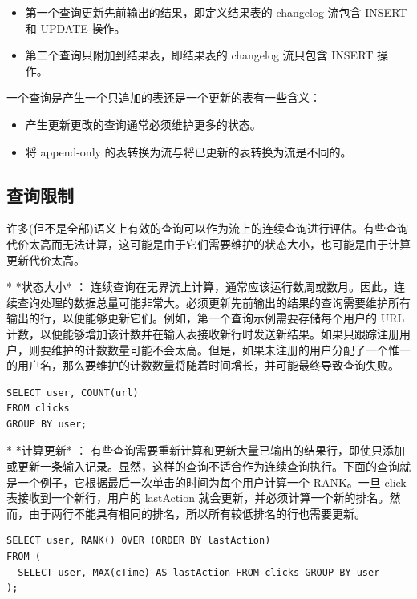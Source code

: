 \documentclass[cn,11pt,chinese]{elegantbook}
\begin{document}
\begin{itemize}
  \item 第一个查询更新先前输出的结果，即定义结果表的 changelog 流包含 INSERT 和 UPDATE 操作。
  \item 第二个查询只附加到结果表，即结果表的 changelog 流只包含 INSERT 操作。
\end{itemize}

一个查询是产生一个只追加的表还是一个更新的表有一些含义：

\begin{itemize}
  \item 产生更新更改的查询通常必须维护更多的状态。
  \item 将 append-only 的表转换为流与将已更新的表转换为流是不同的。
\end{itemize}

\subsection{查询限制}

许多(但不是全部)语义上有效的查询可以作为流上的连续查询进行评估。有些查询代价太高而无法计算，这可能是由于它们需要维护的状态大小，也可能是由于计算更新代价太高。

* *状态大小* ： 连续查询在无界流上计算，通常应该运行数周或数月。因此，连续查询处理的数据总量可能非常大。必须更新先前输出的结果的查询需要维护所有输出的行，以便能够更新它们。例如，第一个查询示例需要存储每个用户的 URL 计数，以便能够增加该计数并在输入表接收新行时发送新结果。如果只跟踪注册用户，则要维护的计数数量可能不会太高。但是，如果未注册的用户分配了一个惟一的用户名，那么要维护的计数数量将随着时间增长，并可能最终导致查询失败。

\begin{verbatim}
SELECT user, COUNT(url)
FROM clicks
GROUP BY user;
\end{verbatim}

* *计算更新* ： 有些查询需要重新计算和更新大量已输出的结果行，即使只添加或更新一条输入记录。显然，这样的查询不适合作为连续查询执行。下面的查询就是一个例子，它根据最后一次单击的时间为每个用户计算一个 RANK。一旦 click 表接收到一个新行，用户的 lastAction 就会更新，并必须计算一个新的排名。然而，由于两行不能具有相同的排名，所以所有较低排名的行也需要更新。

\begin{verbatim}
SELECT user, RANK() OVER (ORDER BY lastAction)
FROM (
  SELECT user, MAX(cTime) AS lastAction FROM clicks GROUP BY user
);
\end{verbatim}
\end{document}
